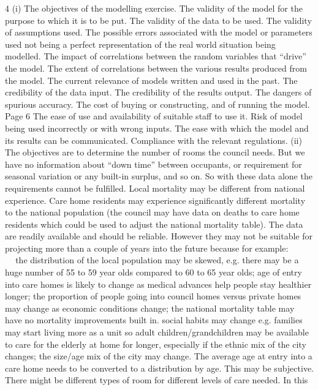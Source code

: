 {{%
4
(i)
The objectives of the modelling exercise.
The validity of the model for the purpose to which it is to be put.
The validity of the data to be used.
The validity of assumptions used.
The possible errors associated with the model or parameters used not being a perfect
representation of the real world situation being modelled.
The impact of correlations between the random variables that “drive” the model.
The extent of correlations between the various results produced from the model.
The current relevance of models written and used in the past.
The credibility of the data input.
The credibility of the results output.
The dangers of spurious accuracy.
The cost of buying or constructing, and of running the model.
Page 6%
The ease of use and availability of suitable staff to use it.
Risk of model being used incorrectly or with wrong inputs.
The ease with which the model and its results can be communicated.
Compliance with the relevant regulations.
(ii)
The objectives are to determine the number of rooms the council needs.
But we have no information about “down time” between occupants, or
requirement for seasonal variation or any built-in surplus, and so on.
So with these data alone the requirements cannot be fulfilled.
Local mortality may be different from national experience.
Care home residents may experience significantly different mortality to the
national population (the council may have data on deaths to care home residents
which could be used to adjust the national mortality table).
The data are readily available and should be reliable.
However they may not be suitable for projecting more than a couple of years into the
future because for example:






the distribution of the local population may be skewed, e.g. there may be a huge
number of 55 to 59 year olds compared to 60 to 65 year olds;
age of entry into care homes is likely to change as medical advances help people
stay healthier longer;
the proportion of people going into council homes versus private homes may
change as economic conditions change;
the national mortality table may have no mortality improvements built in.
social habits may change e.g. families may start living more as a unit so adult
children/grandchildren may be available to care for the elderly at home for longer,
especially if the ethnic mix of the city changes;
the size/age mix of the city may change.
The average age at entry into a care home needs to be converted to a distribution by
age. This may be subjective.
There might be different types of room for different levels of care needed. In this
}}
